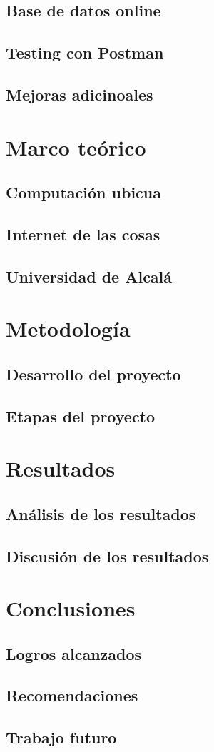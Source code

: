 \documentclass[12pt]{report}
\begin{document}
\section{Base de datos online} %
\section{Testing con Postman} %
\section{Mejoras adicinoales} %


\chapter{Marco teórico}
\section{Computación ubicua}
\lipsum[1-2]
\newpage
\section{Internet de las cosas}
\lipsum[3-4]
\newpage
\section{Universidad de Alcalá}
\lipsum[5-6]

\chapter{Metodología}
\section{Desarrollo del proyecto}
\lipsum[1-2]
\newpage
\section{Etapas del proyecto}
\lipsum[3-4]

\chapter{Resultados}
\section{Análisis de los resultados}
\lipsum[1-2]
\newpage
\section{Discusión de los resultados}
\lipsum[3-4]

\chapter{Conclusiones}
\section{Logros alcanzados}
\lipsum[1-2]
\newpage
\section{Recomendaciones}
\lipsum[3-4]
\newpage
\section{Trabajo futuro}
\lipsum[5-6]
\end{document}
